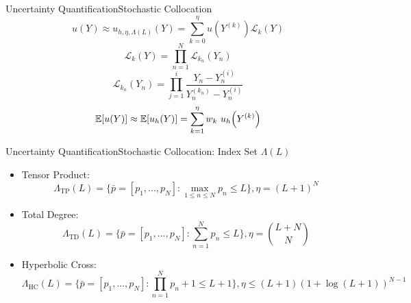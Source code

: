 \documentclass{beamer}
\newcommand{\expv}[1]{\ensuremath{\mathbb{E}[ #1]}}
\begin{document}
\begin{frame}{Uncertainty Quantification}{Stochastic Collocation}\vspace{-20pt}
\small
\begin{equation*}\label{approx}
u(Y)\approx u_{h,\eta,\Lambda(L)}(Y)=\sum_{k=0}^\eta u(Y^{(k)})\mathcal{L}_k(Y)
\end{equation*}
\begin{equation*}
\mathcal{L}_k(Y)=\prod_{n=1}^N \mathcal{L}_{k_n}(Y_n)
\end{equation*}
\begin{equation*}
\mathcal{L}_{k_n}(Y_n)=\prod_{j=1}^i \frac{Y_n-Y_n^{(i)}}{Y_n^{(k_n)}-Y_n^{(i)}}
\end{equation*}
\begin{equation*}
\expv{u(Y)}\approx\expv{u_h(Y)}=\sum_{k=1}^\eta w_k ~u_h\qty(Y^{(k)})
\end{equation*}
\end{frame}

\begin{frame}{Uncertainty Quantification}{Stochastic Collocation: Index Set $\Lambda(L)$}\vspace{-20pt}
\begin{itemize}
\item Tensor Product:\scriptsize\[\Lambda_\text{TP}(L)=\Big\{\bar p=[p_1,...,p_N]: \max_{1\leq n\leq N}p_n\leq L \Big\},\eta=(L+1)^N\]\normalsize
\item Total Degree: \scriptsize\[\Lambda_\text{TD}(L)=\Big\{\bar p=[p_1,...,p_N]:\sum_{n=1}^N p_n \leq L \Big\},\eta={L+N\choose N}\]\normalsize
\item Hyperbolic Cross: \scriptsize\[\Lambda_\text{HC}(L)=\Big\{\bar p=[p_1,...,p_N]:\prod_{n=1}^N p_n+1 \leq L+1 \Big\},\eta\leq (L+1)(1+\log(L+1))^{N-1}\]
\end{itemize}
\end{frame}
\end{document}
